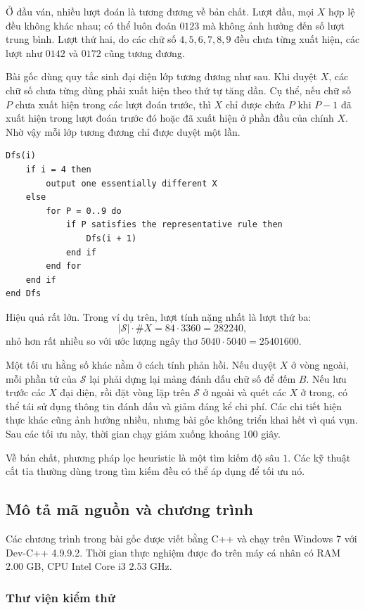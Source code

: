 \documentclass[11pt]{article}
\newcommand{\SetS}{\mathcal{S}}
\begin{document}
Ở đầu ván, nhiều lượt đoán là tương đương về bản chất. Lượt đầu, mọi \(X\) hợp
lệ đều không khác nhau; có thể luôn đoán \(0123\) mà không ảnh hưởng đến số
lượt trung bình. Lượt thứ hai, do các chữ số \(4,5,6,7,8,9\) đều chưa từng
xuất hiện, các lượt như \(0142\) và \(0172\) cũng tương đương.

Bài gốc dùng quy tắc sinh đại diện lớp tương đương như sau. Khi duyệt \(X\),
các chữ số chưa từng dùng phải xuất hiện theo thứ tự tăng dần. Cụ thể, nếu
chữ số \(P\) chưa xuất hiện trong các lượt đoán trước, thì \(X\) chỉ được chứa
\(P\) khi \(P-1\) đã xuất hiện trong lượt đoán trước đó hoặc đã xuất hiện ở
phần đầu của chính \(X\). Nhờ vậy mỗi lớp tương đương chỉ được duyệt một lần.

\begin{verbatim}
Dfs(i)
    if i = 4 then
        output one essentially different X
    else
        for P = 0..9 do
            if P satisfies the representative rule then
                Dfs(i + 1)
            end if
        end for
    end if
end Dfs
\end{verbatim}

Hiệu quả rất lớn. Trong ví dụ trên, lượt tính nặng nhất là lượt thứ ba:
\[
  |\SetS|\cdot \#X = 84\cdot 3360 = 282240,
\]
nhỏ hơn rất nhiều so với ước lượng ngây thơ \(5040\cdot 5040=25401600\).

Một tối ưu hằng số khác nằm ở cách tính phản hồi. Nếu duyệt \(X\) ở vòng ngoài,
mỗi phần tử của \(\SetS\) lại phải dựng lại mảng đánh dấu chữ số để đếm \(B\).
Nếu lưu trước các \(X\) đại diện, rồi đặt vòng lặp trên \(\SetS\) ở ngoài và
quét các \(X\) ở trong, có thể tái sử dụng thông tin đánh dấu và giảm đáng kể
chi phí. Các chi tiết hiện thực khác cũng ảnh hưởng nhiều, nhưng bài gốc không
triển khai hết vì quá vụn. Sau các tối ưu này, thời gian chạy giảm xuống
khoảng \(100\) giây.

Về bản chất, phương pháp lọc heuristic là một tìm kiếm độ sâu \(1\). Các kỹ
thuật cắt tỉa thường dùng trong tìm kiếm đều có thể áp dụng để tối ưu nó.

\subsection{Mô tả mã nguồn và chương trình}

Các chương trình trong bài gốc được viết bằng C++ và chạy trên Windows 7 với
Dev-C++ 4.9.9.2. Thời gian thực nghiệm được đo trên máy cá nhân có RAM
\(2.00\) GB, CPU Intel Core i3 \(2.53\) GHz.

\subsubsection{Thư viện kiểm thử}
\end{document}
